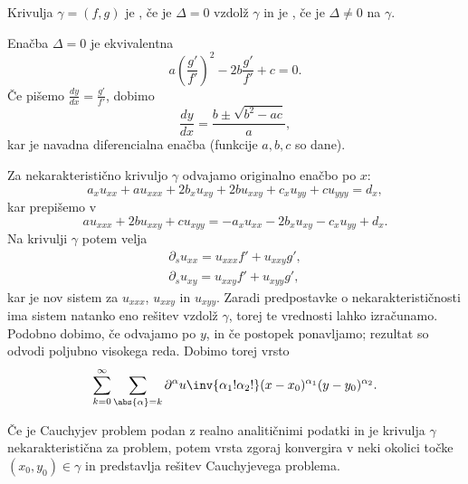 \begin{definicija}
  Krivulja $\gamma = (f,g)$ je , če je $\Delta = 0$
  vzdolž $\gamma$ in je , če je $\Delta \ne 0$ na
  $\gamma$.
\end{definicija}


Enačba $\Delta = 0$ je ekvivalentna
\[
  a \left( \frac{g'}{f'} \right)^2 - 2b \frac{g'}{f'} + c = 0.
\]
Če pišemo $\frac{dy}{dx} = \frac{g'}{f'}$, dobimo
\[
  \frac{dy}{dx} = \frac{b \pm \sqrt{b^2 - ac}}{a},
\]
kar je navadna diferencialna enačba (funkcije $a, b, c$ so dane).

Za nekarakteristično krivuljo $\gamma$ odvajamo originalno enačbo po $x$:
\[
  a_x u_{xx} + a u_{xxx} + 2 b_x u_{xy} + 2b u_{xxy} + c_x u_{yy} + c u_{yyy} =
  d_x,
\]
kar prepišemo v
\[
  a u_{xxx} + 2b u_{xxy} + c u_{xyy} = - a_x u_{xx} - 2b_x u_{xy} - c_x u_{yy} +
  d_x.
\]
Na krivulji $\gamma$ potem velja
\begin{gather*}
  \partial_s u_{xx} = u_{xxx} f' + u_{xxy} g', \\
  \partial_s u_{xy} = u_{xxy} f' + u_{xyy} g',
\end{gather*}
kar je nov sistem za $u_{xxx}$, $u_{xxy}$ in $u_{xyy}$.
Zaradi predpostavke o nekarakterističnosti ima sistem natanko eno rešitev vzdolž
$\gamma$, torej te vrednosti lahko izračunamo.
Podobno dobimo, če odvajamo po $y$, in če postopek ponavljamo; rezultat so
odvodi poljubno visokega reda.
Dobimo torej vrsto
\[
  \sum_{k=0}^\infty \sum_{\abs{\alpha} = k} \partial^\alpha u \inv{\alpha_1!
	\alpha_2!} (x - x_0)^{\alpha_1} (y - y_0)^{\alpha_2}.
\]

\begin{izrek}
  Če je Cauchyjev problem podan z realno analitičnimi podatki in je krivulja
  $\gamma$ nekarakteristična za problem, potem vrsta zgoraj konvergira v neki
  okolici točke $(x_0, y_0) \in \gamma$ in predstavlja rešitev Cauchyjevega
  problema.
\end{izrek}


